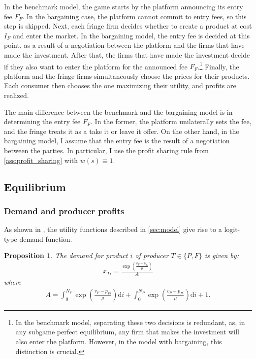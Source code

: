 \documentclass[a4paper]{article}
\newtheorem{proposition}{Proposition}
\newcommand{\di}{\mathrm{d}i}
\begin{document}
In the benchmark model, the game starts by the platform announcing its entry fee $F_F$.
In the bargaining case, the platform cannot commit to entry fees, so this step is skipped.
Next, each fringe firm decides whether to create a product at cost $I_F$ and enter the market.
In the bargaining model, the entry fee is decided at this point, as a result of a negotiation between the platform and the firms that have made the investment.
After that, the firms that have made the investment decide if they also want to enter the platform for the announced fee $F_F$.\footnote{
    In the benchmark model, separating these two decisions is redundant, as, in any subgame perfect equilibrium, any firm that makes the investment will also enter the platform.
    However, in the model with bargaining, this distinction is crucial.
}
Finally, the platform and the fringe firms simultaneously choose the prices for their products.
Each consumer then chooses the one maximizing their utility, and profits are realized.

The main difference between the benchmark and the bargaining model is in determining the entry fee $F_F$.
In the former, the platform unilaterally sets the fee, and the fringe treats it as a take it or leave it offer.
On the other hand, in the bargaining model, I assume that the entry fee is the result of a negotiation between the parties.
In particular, I use the profit sharing rule from \cref{ass:profit_sharing} with $w(s) \equiv 1$.


\subsection{Equilibrium}

\subsubsection{Demand and producer profits}

As shown in \textcite[]{anderson2021hybrid}, the utility functions described in \cref{sec:model} give rise to a logit-type demand function.
\begin{proposition}
    The demand for product $i$ of producer $T \in \{P, F\}$ is given by:
    \begin{align*}
        x_{Ti} = \frac{\exp\left( \frac{v_T - p_{Ti}}{\mu} \right)}{A}
    \end{align*}
    where
    \begin{align}
        A = \int_0^{N_F} \exp\left( \frac{v_F - p_{Fi}}{\mu} \right) \di + \int_0^{N_P} \exp\left( \frac{v_P - p_{Pi}}{\mu} \right) \di + 1.
        \label{eq:aggregate}
    \end{align}
\end{proposition}
\end{document}
